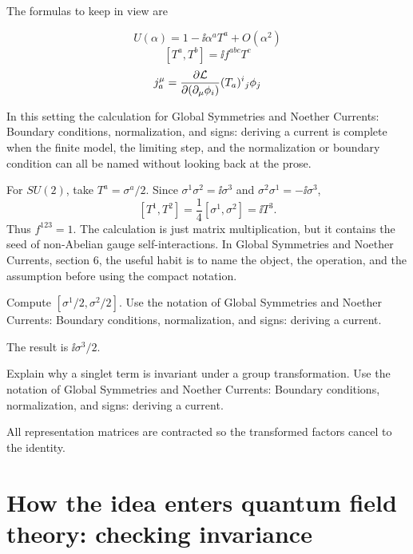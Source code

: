 The formulas to keep in view are

\[
  U(\alpha)=1-\ii\alpha^aT^a+O(\alpha^2)
\]
\[
  [T^a,T^b]=\ii f^{abc}T^c
\]
\[
  j^\mu_a=\frac{\partial\mathcal L}{\partial(\partial_\mu\phi_i)}(T_a)^i{}_j\phi_j
\]

In this setting the calculation for Global Symmetries and Noether Currents: Boundary conditions, normalization, and signs: deriving a current is complete when the finite model, the limiting step, and the normalization or boundary condition can all be named without looking back at the prose.




\begin{example}
For \(SU(2)\), take \(T^a=\sigma^a/2\).  Since \(\sigma^1\sigma^2=\ii\sigma^3\) and \(\sigma^2\sigma^1=-\ii\sigma^3\),
\[
  [T^1,T^2]=\frac14[\sigma^1,\sigma^2]=\ii T^3.
\]
Thus \(f^{123}=1\).  The calculation is just matrix multiplication, but it contains the seed of non-Abelian gauge self-interactions.  In Global Symmetries and Noether Currents, section 6, the useful habit is to name the object, the operation, and the assumption before using the compact notation.
\end{example}



\begin{exercise}
Compute \([\sigma^1/2,\sigma^2/2]\).  Use the notation of Global Symmetries and Noether Currents: Boundary conditions, normalization, and signs: deriving a current.
\begin{answer}
The result is \(\ii\sigma^3/2\).
\end{answer}
\end{exercise}

\begin{exercise}
Explain why a singlet term is invariant under a group transformation.  Use the notation of Global Symmetries and Noether Currents: Boundary conditions, normalization, and signs: deriving a current.
\begin{answer}
All representation matrices are contracted so the transformed factors cancel to the identity.
\end{answer}
\end{exercise}



\section{How the idea enters quantum field theory: checking invariance}

